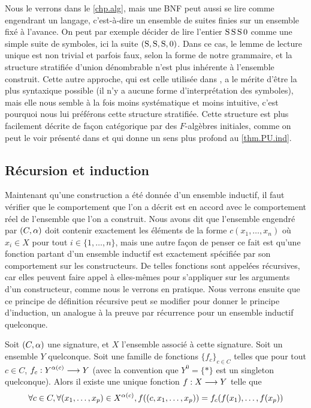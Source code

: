 \begin{remark}
  Nous le verrons dans le \cref{chp.alg}, mais une BNF peut aussi se lire comme
  engendrant un langage, c'est-à-dire un ensemble de suites finies sur un
  ensemble fixé à l'avance. On peut par exemple décider de lire l'entier
  $\operatorname{S}\operatorname{S}\operatorname{S} 0$
  comme une simple suite de symboles, ici la suite $(\operatorname{S},\operatorname{S},\operatorname{S},0)$. Dans ce
  cas, le lemme de lecture unique est non trivial et parfois faux, selon la
  forme de
  notre grammaire, et la structure stratifiée d'union dénombrable n'est plus
  inhérente à l'ensemble construit. Cette autre approche, qui est celle utilisée
  dans \cite{Cori2003}, a le mérite d'être la plus syntaxique possible
  (il n'y a aucune forme d'interprétation des symboles), mais elle nous semble à
  la fois moins systématique et moins intuitive, c'est pourquoi nous lui
  préférons cette structure stratifiée. Cette structure est plus facilement
  décrite de façon catégorique par des $F$-algèbres initiales, comme on peut le
  voir présenté dans \cite{Jacobs1999} et qui donne un sens plus profond au
  \cref{thm.PU.ind}.
\end{remark}

\subsection{Récursion et induction}

Maintenant qu'une construction a été donnée d'un ensemble inductif, il faut
vérifier que le comportement que l'on a décrit est en accord avec le
comportement réel de l'ensemble que l'on a construit. Nous avons dit que
l'ensemble engendré par $(C,\alpha)$ doit contenir exactement les éléments de
la forme $c(x_1,\ldots,x_n)$ où $x_i \in X$ pour tout $i\in\{1,\ldots,n\}$, mais
une autre façon de penser ce fait est qu'une fonction partant d'un ensemble
inductif est exactement spécifiée par son comportement sur les constructeurs.
De telles fonctions sont appelées récursives, car elles peuvent faire appel à
elles-mêmes pour s'appliquer sur les arguments d'un constructeur, comme nous le
verrons en pratique. Nous verrons ensuite que ce principe de définition
récursive peut se modifier pour donner le principe d'induction, un analogue à
la preuve par récurrence pour un ensemble inductif quelconque.

\begin{theorem}\label{thm.PU.ind}
  Soit $(C,\alpha)$ une signature, et $X$ l'ensemble associé à cette signature.
  Soit un ensemble $Y$ quelconque.
  Soit une famille de fonctions $\{f_c\}_{c\in C}$ telles que pour tout $c\in C$,
  $f_c : \displaystyle Y^{\alpha(c)} \longrightarrow Y$
  (avec la convention que $Y^0 = \{*\}$ est un
  singleton quelconque). Alors il existe une unique fonction
  $f : \displaystyle X \longrightarrow Y$ telle que
  \[\forall c\in C, \forall (x_1,\ldots,x_p)\in X^{\alpha(c)},
  f((c,x_1,\ldots,x_p)) = f_c (f(x_1),\ldots,f(x_p))\]
\end{theorem}


